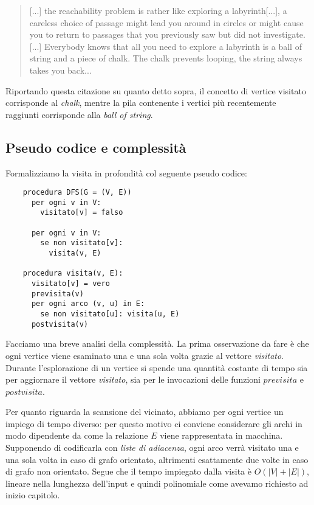 \begin{quotation}
  [...] the reachability problem is rather like exploring a
  labyrinth[...], a careless choice of passage might lead you around
  in circles or might cause you to return to passages that you
  previously saw but did not investigate.[...] Everybody knows that
  all you need to explore a labyrinth is a ball of string and a piece
  of chalk. The chalk prevents looping, the string always takes you
  back...
\end{quotation}
Riportando questa citazione su quanto detto sopra, il concetto di
vertice visitato corrisponde al \emph{chalk}, mentre la pila
contenente i vertici pi\`u recentemente raggiunti corrisponde alla
\emph{ball of string}.

\subsection{Pseudo codice e complessit\`a}
Formalizziamo la visita in profondit\`a col seguente pseudo codice:
\begin{lstlisting}
    procedura DFS(G = (V, E))
      per ogni v in V:
        visitato[v] = falso

      per ogni v in V:
        se non visitato[v]:
          visita(v, E)

    procedura visita(v, E):
      visitato[v] = vero
      previsita(v)
      per ogni arco (v, u) in E:
        se non visitato[u]: visita(u, E)
      postvisita(v)
\end{lstlisting}
Facciamo una breve analisi della complessit\`a. La prima osservazione
da fare \`e che ogni vertice viene esaminato una e una sola volta
grazie al vettore \emph{visitato}. Durante l'esplorazione di un
vertice si spende una quantit\`a costante di tempo sia per aggiornare
il vettore \emph{visitato}, sia per le invocazioni delle funzioni
$previsita$ e $postvisita$.

Per quanto riguarda la scansione del vicinato, abbiamo per ogni
vertice un impiego di tempo diverso: per questo motivo ci conviene
considerare gli archi in modo dipendente da come la relazione $E$
viene rappresentata in macchina. Supponendo di codificarla con
\emph{liste di adiacenza}, ogni arco verr\`a visitato una e una sola
volta in caso di grafo orientato, altrimenti esattamente due volte in
caso di grafo non orientato. Segue che il tempo impiegato dalla visita
\`e $O(|V| + |E|)$, lineare nella lunghezza dell'input e quindi
polinomiale come avevamo richiesto ad inizio capitolo.


